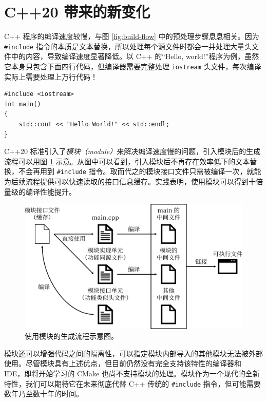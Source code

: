 
\section{C++20 带来的新变化}

C++ 程序的编译速度较慢，与图 \ref{fig:build-flow} 中的预处理步骤息息相关。因为 \lstinline[language={[latest]C++}]{#include} 指令的本质是文本替换，所以处理每个源文件时都会一并处理大量头文件中的内容，导致编译速度显著降低。以 C++ 的“Hello, world!”程序为例，虽然它本身只包含下面四行代码，但编译器需要完整处理 \lstinline[language={}]{iostream} 头文件，每次编译实际上需要处理上万行代码\cite{cpp-module-1}！

\begin{lstlisting}[language={[latest]C++}, moreemph={[2]endl}]
#include <iostream>
int main()
{
	std::cout << "Hello World!" << std::endl;
}
\end{lstlisting}

C++20 标准引入了\emph{模块（module）}来解决编译速度慢的问题，引入模块后的生成流程可以用图 \ref{fig:module} 示意\cite{cpp-module-1}。从图中可以看到，引入模块后不再存在效率低下的文本替换，不会再用到 \lstinline[language={[latest]C++}]{#include} 指令。取而代之的模块接口文件只需被编译一次，就能为后续流程提供可以快速读取的接口信息缓存。实践表明，使用模块可以得到十倍量级的编译性能提升\cite{cpp-module-2}。

\begin{figure}
	\centering
	\includegraphics[scale=0.15]{assets/module}
	\caption{使用模块的生成流程示意图。}
	\label{fig:module}
\end{figure}

模块还可以增强代码之间的隔离性，可以指定模块内部导入的其他模块无法被外部使用\cite{cpp-module-3}。尽管模块具有上述优点，但目前仍然没有完全支持该特性的编译器和 IDE，即将开始学习的 CMake 也尚不支持模块的处理。模块作为一个现代的全新特性，我们可以期待它在未来彻底代替 C++ 传统的 \lstinline[language={[latest]C++}]{#include} 指令，但可能需要数年乃至数十年的时间。